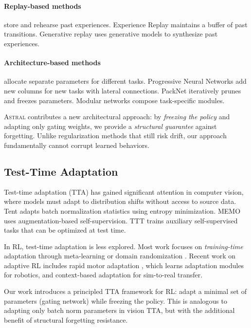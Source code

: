 \documentclass{article}
\newcommand{\astral}{\textsc{Astral}}
\newcommand{\method}{\astral}
\begin{document}
\paragraph{Replay-based methods} store and rehearse past experiences. Experience Replay \citep{rolnick2019experience} maintains a buffer of past transitions. Generative replay \citep{shin2017continual} uses generative models to synthesize past experiences.

\paragraph{Architecture-based methods} allocate separate parameters for different tasks. Progressive Neural Networks \citep{rusu2016progressive} add new columns for new tasks with lateral connections. PackNet \citep{mallya2018packnet} iteratively prunes and freezes parameters. Modular networks \citep{andreas2016neural} compose task-specific modules.

\method{} contributes a new architectural approach: by \emph{freezing the policy} and adapting only gating weights, we provide a \emph{structural guarantee} against forgetting. Unlike regularization methods that still risk drift, our approach fundamentally cannot corrupt learned behaviors.

\subsection{Test-Time Adaptation}

Test-time adaptation (TTA) has gained significant attention in computer vision, where models must adapt to distribution shifts without access to source data. Tent \citep{wang2021tent} adapts batch normalization statistics using entropy minimization. MEMO \citep{zhang2022memo} uses augmentation-based self-supervision. TTT \citep{sun2020test} trains auxiliary self-supervised tasks that can be optimized at test time.

In RL, test-time adaptation is less explored. Most work focuses on \emph{training-time} adaptation through meta-learning \citep{finn2017maml} or domain randomization \citep{tobin2017domain}. Recent work on adaptive RL includes rapid motor adaptation \citep{kumar2021rma}, which learns adaptation modules for robotics, and context-based adaptation \citep{lee2020context} for sim-to-real transfer.

Our work introduces a principled TTA framework for RL: adapt a minimal set of parameters (gating network) while freezing the policy. This is analogous to adapting only batch norm parameters in vision TTA, but with the additional benefit of structural forgetting resistance.
\end{document}
